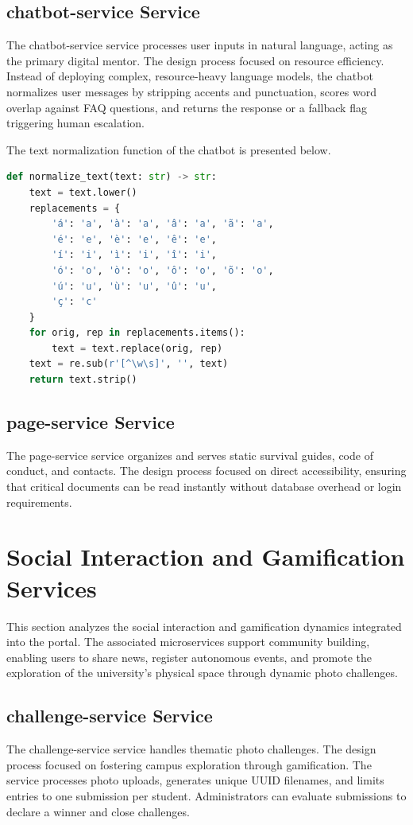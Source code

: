 \documentclass[12pt]{article}
\begin{document}
\subsection{chatbot-service Service}
The chatbot-service service processes user inputs in natural language, acting as the primary digital mentor. The design process focused on resource efficiency. Instead of deploying complex, resource-heavy language models, the chatbot normalizes user messages by stripping accents and punctuation, scores word overlap against FAQ questions, and returns the response or a fallback flag triggering human escalation.

The text normalization function of the chatbot is presented below.

\begin{lstlisting}[language=Python]
def normalize_text(text: str) -> str:
    text = text.lower()
    replacements = {
        'á': 'a', 'à': 'a', 'â': 'a', 'ã': 'a',
        'é': 'e', 'è': 'e', 'ê': 'e',
        'í': 'i', 'ì': 'i', 'î': 'i',
        'ó': 'o', 'ò': 'o', 'ô': 'o', 'õ': 'o',
        'ú': 'u', 'ù': 'u', 'û': 'u',
        'ç': 'c'
    }
    for orig, rep in replacements.items():
        text = text.replace(orig, rep)
    text = re.sub(r'[^\w\s]', '', text)
    return text.strip()
\end{lstlisting}

\subsection{page-service Service}
The page-service service organizes and serves static survival guides, code of conduct, and contacts. The design process focused on direct accessibility, ensuring that critical documents can be read instantly without database overhead or login requirements.

\section{Social Interaction and Gamification Services}
This section analyzes the social interaction and gamification dynamics integrated into the portal. The associated microservices support community building, enabling users to share news, register autonomous events, and promote the exploration of the university's physical space through dynamic photo challenges.

\subsection{challenge-service Service}
The challenge-service service handles thematic photo challenges. The design process focused on fostering campus exploration through gamification. The service processes photo uploads, generates unique UUID filenames, and limits entries to one submission per student. Administrators can evaluate submissions to declare a winner and close challenges.
\end{document}
